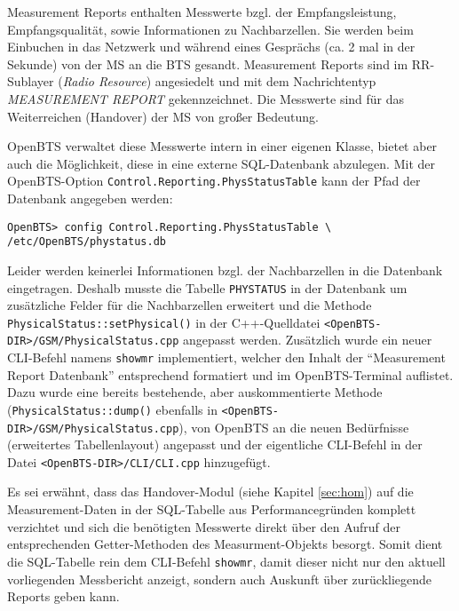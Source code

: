 \label{sec:measrep}
Measurement Reports enthalten Messwerte bzgl. der Empfangsleistung, Empfangsqualität, sowie Informationen zu Nachbarzellen. Sie werden beim Einbuchen in das Netzwerk und während eines Gesprächs (ca. 2 mal in der Sekunde) von der MS an die BTS gesandt. Measurement Reports sind im RR-Sublayer (\textit{Radio Resource}) angesiedelt und mit dem Nachrichtentyp \textit{MEASUREMENT REPORT} gekennzeichnet. Die Messwerte sind für das Weiterreichen (Handover) der MS von großer Bedeutung.

OpenBTS verwaltet diese Messwerte intern in einer eigenen Klasse, bietet aber auch die Möglichkeit, diese in eine externe SQL-Datenbank abzulegen. Mit der OpenBTS-Option \verb|Control.Reporting.PhysStatusTable| kann der Pfad der Datenbank angegeben werden:
\begin{verbatim}
OpenBTS> config Control.Reporting.PhysStatusTable \
/etc/OpenBTS/phystatus.db
\end{verbatim}

Leider werden keinerlei Informationen bzgl. der Nachbarzellen in die Datenbank eingetragen. Deshalb musste die Tabelle \verb|PHYSTATUS| in der Datenbank um zusätzliche Felder für die Nachbarzellen erweitert und die Methode \verb|PhysicalStatus::setPhysical()| in der C++-Quelldatei \verb|<OpenBTS-DIR>/GSM/PhysicalStatus.cpp| angepasst werden.
Zusätzlich wurde ein neuer CLI-Befehl namens \verb|showmr| implementiert, welcher den Inhalt der "`Measurement Report Datenbank"' entsprechend formatiert und im OpenBTS-Terminal auflistet. Dazu wurde eine bereits bestehende, aber auskommentierte Methode (\verb|PhysicalStatus::dump()| ebenfalls in \verb|<OpenBTS-DIR>/GSM/PhysicalStatus.cpp|), von OpenBTS an die neuen Bedürfnisse (erweitertes Tabellenlayout) angepasst und der eigentliche CLI-Befehl in der Datei \verb|<OpenBTS-DIR>/CLI/CLI.cpp| hinzugefügt.

Es sei erwähnt, dass das Handover-Modul (siehe Kapitel \ref{sec:hom}) auf die Measurement-Daten in der SQL-Tabelle  aus Performancegründen komplett verzichtet und sich die benötigten Messwerte direkt über den Aufruf der entsprechenden Getter-Methoden des Measurment-Objekts besorgt. Somit dient die SQL-Tabelle rein dem CLI-Befehl \verb|showmr|, damit dieser nicht nur den aktuell vorliegenden Messbericht anzeigt, sondern auch Auskunft über zurückliegende Reports geben kann.


